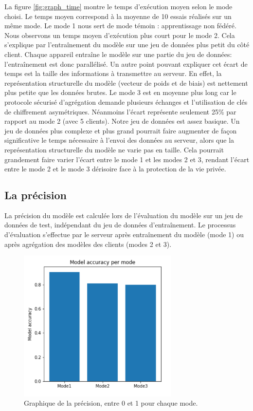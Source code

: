 \documentclass{article}
\begin{document}
La figure \ref{fig:graph_time} montre le temps d'exécution moyen selon le mode choisi. Le temps moyen correspond à la moyenne de 10 essais réalisés sur un même mode.
Le mode 1 nous sert de mode témoin : apprentissage non fédéré. Nous observons un temps moyen d'exécution plus court pour le mode 2. Cela s’explique par l'entraînement du modèle sur une jeu de données plus petit du côté client. Chaque appareil entraîne le modèle sur une partie du jeu de données: l'entraînement est donc parallélisé. 
Un autre point pouvant expliquer cet écart de temps est la taille des informations à transmettre au serveur. En effet, la représentation structurelle du modèle (vecteur de poids et de biais) est nettement plus petite que les données brutes.
Le mode 3 est en moyenne plus long car le protocole sécurisé d'agrégation demande plusieurs échanges et l'utilisation de clés de chiffrement asymétriques. Néanmoins l'écart représente seulement 25\% par rapport au mode 2 (avec 5 clients).
Notre jeu de données est assez basique. Un jeu de données plus complexe et plus grand pourrait faire augmenter de façon significative le temps nécessaire à l'envoi des données au serveur, alors que la représentation structurelle du modèle ne varie pas en taille. Cela pourrait grandement faire varier l'écart entre le mode 1 et les modes 2 et 3, rendant l'écart entre le mode 2 et le mode 3 dérisoire face à la protection de la vie privée.

\subsection{La précision}
La précision du modèle est calculée lors de l’évaluation du modèle sur un jeu de données de test, indépendant du jeu de données d'entraînement.
Le processus d'évaluation s'effectue par le serveur après entraînement du modèle (mode 1) ou après agrégation des modèles des clients (modes 2 et 3).
    \begin{figure}[H]
    \centerline{\includegraphics[width=8cm]{img/graph_accuracy_per_mode.png}}
  \caption{Graphique de la précision, entre 0 et 1 pour chaque mode.}
  \label{fig:graph_accuracy}
\end{figure}
\end{document}
